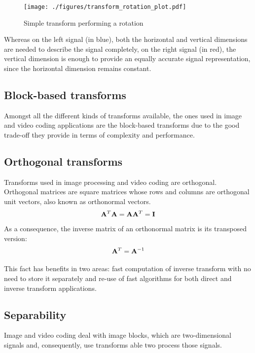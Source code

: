 \documentclass[11pt,a4paper,openright,twoside]{book}
\numberwithin{equation}{section} %
\numberwithin{figure}{section} %
\numberwithin{table}{section} %
\begin{document}
\begin{figure}[tb]
	\centering
	\texttt{[image: ./figures/transform\_rotation\_plot.pdf]}
	\caption{Simple transform performing a rotation}
	\label{fig:transform_rotation}
\end{figure}

Whereas on the left signal (in blue), both the horizontal and vertical
dimensions are needed to describe the signal completely, on the right
signal (in red), the vertical dimension is enough to provide an equally
accurate signal representation, since the horizontal dimension remains
constant.

\subsection{Block-based transforms}
\label{sub:block_based_transforms}

Amongst all the different kinds of transforms available, the ones used
in image and video coding applications are the block-based transforms
due to the good trade-off they provide in terms of complexity and
performance.

\subsection{Orthogonal transforms}
\label{sub:orthogonal_transforms}

Transforms used in image processing and video coding are orthogonal.
Orthogonal matrices are square matrices whose rows and columns are orthogonal
unit vectors, also known as orthonormal vectors.
\begin{equation}
	\mathbf{A}^T\mathbf{A} = \mathbf{A}\mathbf{A}^T = \mathbf{I}
\end{equation}
As a consequence, the inverse matrix of an orthonormal matrix is its
transposed version:
\begin{equation}
	\mathbf{A}^T = \mathbf{A}^{-1}
\end{equation}

This fact has benefits in two areas: fast computation of inverse transform
with no need to store it separately and re-use of fast algorithms for both
direct and inverse transform applications.

\subsection{Separability}
\label{sub:separability}

Image and video coding deal with image blocks, which are two-dimensional
signals and, consequently, use transforms able two process those
signals.
\end{document}
